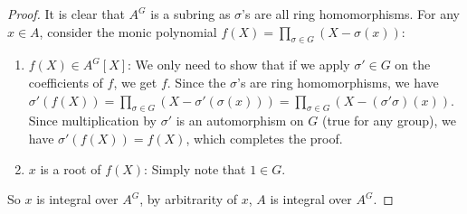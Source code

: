 \documentclass{solution}
\begin{document}
\begin{proof}
    It is clear that $A^G$ is a subring as $\sigma$'s are all ring homomorphisms. For any $x \in A$, consider the monic polynomial $f(X) = \prod\limits_{\sigma \in G} (X - \sigma(x))$:
    \begin{enumerate}
        \item $f(X) \in A^G[X]$: We only need to show that if we apply $\sigma' \in G$ on the coefficients of $f$, we get $f$. Since the $\sigma$'s are ring homomorphisms, we have $\sigma'(f(X)) = \prod\limits_{\sigma \in G} (X - \sigma'(\sigma(x))) = \prod\limits_{\sigma \in G} (X - (\sigma'\sigma)(x))$. Since multiplication by $\sigma'$ is an automorphism on $G$ (true for any group), we have $\sigma'(f(X)) = f(X)$, which completes the proof.
        \item $x$ is a root of $f(X)$: Simply note that $1 \in G$.
    \end{enumerate}
    So $x$ is integral over $A^G$, by arbitrarity of $x$, $A$ is integral over $A^G$.


\end{proof}
\end{document}
